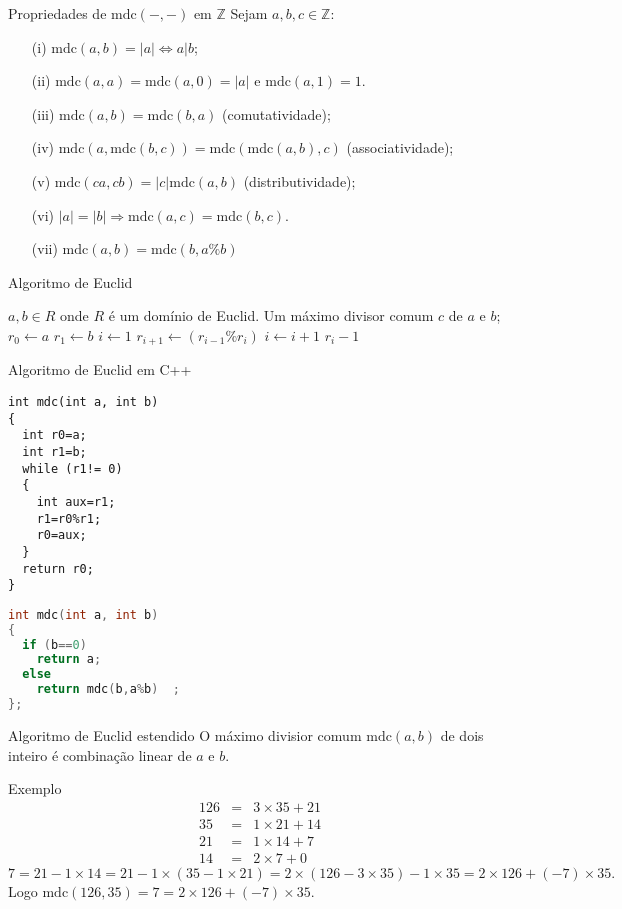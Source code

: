 \documentclass{beamer}
\newcommand{\ZZ}{\mathbb Z}
\newcommand{\mdc}[2]{\mathrm{mdc}({#1}, {#2})}
\begin{document}
\begin{frame}
\begin{block}{Propriedades de $\mdc{-}{-}$ em $\ZZ$} Sejam $a,b,c \in \ZZ$: 
\begin{enumerate}
\item[(i)] $\mdc{a}{b}=|a| \Longleftrightarrow a | b$;
\item[(ii)] $\mdc{a}{a}=\mdc{a}{0}=|a|$ e $\mdc{a}{1}=1$.
\item[(iii)] $\mdc{a}{b}=\mdc{b}{a}$ (comutatividade);
\item[(iv)] $\mdc{a}{\mdc{b}{c}} = \mdc{\mdc{a}{b}}{c}$ (associatividade);
\item[(v)]  $\mdc{ca}{cb} = |c|\mdc{a}{b}$ (distributividade);
\item[(vi)] $|a|=|b| \Rightarrow \mdc{a}{c}=\mdc{b}{c}$.
\item[(vii)] $\mdc{a}{b} = \mdc{b}{a\%b}$
\end{enumerate}
\end{block}
\end{frame}

\begin{frame}[fragile]{Algoritmo de Euclid}
\begin{algorithmic}
\REQUIRE $a,b \in R$ onde $R$ é um domínio de Euclid.
\ENSURE Um máximo divisor comum $c$ de $a$ e $b$;
	\STATE $r_0 \leftarrow a$
	\STATE $r_1 \leftarrow b$
	\STATE $i \leftarrow 1$
		\STATE $r_{i+1}\leftarrow (r_{i-1}\% r_i)$
		\STATE $i\leftarrow i+1$
	\ENDWHILE
	\RETURN $r_i-1$
\end{algorithmic}

\end{frame}


\begin{frame}[fragile]{Algoritmo de Euclid em C++}
\lstset{language=C++,basicstyle=\tiny}
\begin{lstlisting}
int mdc(int a, int b)
{
  int r0=a;
  int r1=b;
  while (r1!= 0)
  {
    int aux=r1;
    r1=r0%r1;
    r0=aux; 
  }
  return r0;
}
\end{lstlisting}
\pause

\begin{lstlisting}[language=C++]
int mdc(int a, int b)
{
  if (b==0) 
    return a;
  else 
    return mdc(b,a%b)  ;
};
\end{lstlisting}
\end{frame}


\begin{frame}{Algoritmo de Euclid estendido}
O máximo divisior comum $\mdc{a}{b}$ de dois inteiro é combinação linear de $a$ e $b$.
\begin{block}{Exemplo}
\begin{eqnarray*}
126 &=& 3\times 35 + 21 \\
35 &=& 1\times 21 + 14 \\
21 &=& 1 \times 14 + 7\\
14 &=& 2\times 7 + 0
\end{eqnarray*}
{\tiny $$7 = 21 - 1\times 14 = 21 - 1\times (35 - 1\times 21) = 2\times (126 - 3\times 35) - 1\times 35 = 2\times 126 + (-7)\times 35.$$}
Logo $\mdc{126}{35} = 7 = 2\times 126 + (-7)\times 35$.
\end{block}
\end{frame}
\end{document}
